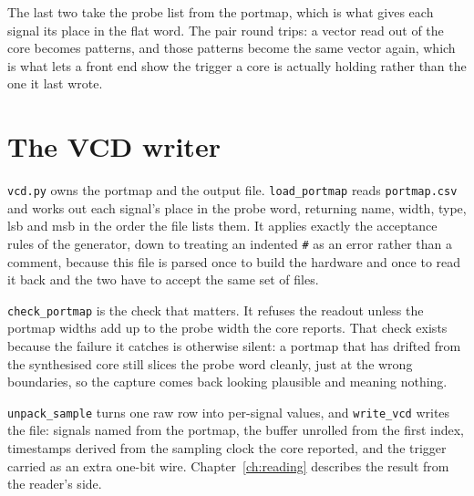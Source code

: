 \documentclass[../manual.tex]{subfiles}
\begin{document}
The last two take the probe list from the portmap, which is what gives each signal its place in the flat word. The pair round trips: a vector read out of the core becomes patterns, and those patterns become the same vector again, which is what lets a front end show the trigger a core is actually holding rather than the one it last wrote.

\section{The VCD writer}
\label{sec:stack_vcd}

\texttt{vcd.py} owns the portmap and the output file. \texttt{load\_portmap} reads \texttt{portmap.csv} and works out each signal's place in the probe word, returning name, width, type, lsb and msb in the order the file lists them. It applies exactly the acceptance rules of the generator, down to treating an indented \texttt{\#} as an error rather than a comment, because this file is parsed once to build the hardware and once to read it back and the two have to accept the same set of files.

\texttt{check\_portmap} is the check that matters. It refuses the readout unless the portmap widths add up to the probe width the core reports. That check exists because the failure it catches is otherwise silent: a portmap that has drifted from the synthesised core still slices the probe word cleanly, just at the wrong boundaries, so the capture comes back looking plausible and meaning nothing.

\texttt{unpack\_sample} turns one raw row into per-signal values, and \texttt{write\_vcd} writes the file: signals named from the portmap, the buffer unrolled from the first index, timestamps derived from the sampling clock the core reported, and the trigger carried as an extra one-bit wire. Chapter~\ref{ch:reading} describes the result from the reader's side.
\end{document}
